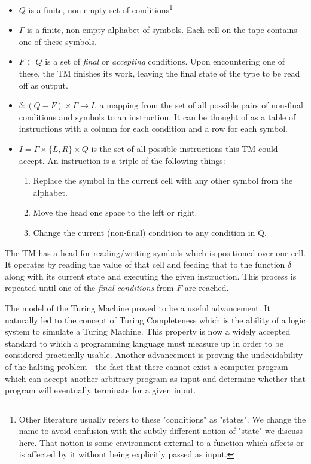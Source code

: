 \begin{itemize}
    \item $Q$ is a finite, non-empty set of conditions\footnote{Other literature usually refers to these "conditions" as "states". We change the name to avoid confusion with the subtly different notion of "state" we discuss here. That notion is some environment external to a function which affects or is affected by it without being explicitly passed as input.}
    \item $\Gamma$ is a finite, non-empty alphabet of symbols. Each cell on the tape contains one of these symbols.
    \item $F \subset Q$ is a set of {\it final} or {\it accepting} conditions. Upon encountering one of these, the TM finishes its work, leaving the final state of the type to be read off as output.
    \item $\delta: (Q - F) \times \Gamma \rightarrow I$, a mapping from the set of all possible pairs of non-final conditions and symbols to an instruction. It can be thought of as a table of instructions with a column for each condition and a row for each symbol.
    \item $I = \Gamma \times \{L, R\} \times Q$ is the set of all possible instructions this TM could accept. An instruction is a triple of the following things:
        \begin{enumerate}
            \item Replace the symbol in the current cell with any other symbol from the alphabet.
            \item Move the head one space to the left or right.
            \item Change the current (non-final) condition to any condition in Q.
        \end{enumerate}
\end{itemize}

The TM has a head for reading/writing symbols which is positioned over one cell. It operates by reading the value of that cell and feeding that to the function $\delta$ along with its current state and executing the given instruction. This process is repeated until one of the {\it final conditions} from $F$ are reached.

The model of the Turing Machine proved to be a useful advancement. It naturally led to the concept of Turing Completeness which is the ability of a logic system to simulate a Turing Machine\cite{TuringEnigma}. This property is now a widely accepted standard to which a programming language must measure up in order to be considered practically usable. Another advancement is proving the undecidability of the halting problem - the fact that there cannot exist a computer program which can accept another arbitrary program as input and determine whether that program will eventually terminate for a given input.

